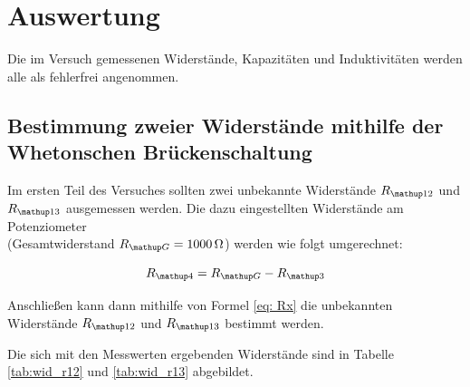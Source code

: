 \newpage
\section{Auswertung}

Die im Versuch gemessenen Widerstände, Kapazitäten und Induktivitäten %
werden alle als fehlerfrei angenommen.

\subsection{Bestimmung zweier Widerstände mithilfe der Whetonschen Brückenschaltung}

Im ersten Teil des Versuches sollten zwei unbekannte Widerstände $R_{\map{12}}$ und $R_{\map{13}}$ ausgemessen werden.
Die dazu eingestellten Widerstände am Potenziometer \\ (Gesamtwiderstand  %
$R_{\map{G}}=\SI{1000}{\ohm}$) werden wie folgt umgerechnet:

\begin{equation*}
R\ua{4}=R\ua{G}-R_{\map{3}}
\end{equation*}

Anschließen kann dann mithilfe von Formel \eqref{eq: Rx} die %
unbekannten Widerstände $R_{\map{12}}$ und $R_{\map{13}}$ bestimmt werden.

Die sich mit den Messwerten ergebenden Widerstände sind in Tabelle \ref{tab:wid_r12} und
\ref{tab:wid_r13} abgebildet.

